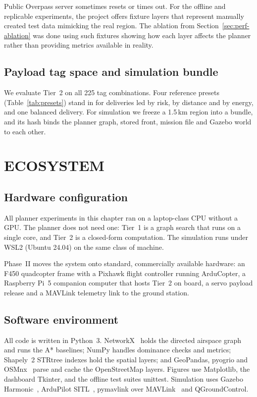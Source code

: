 Public Overpass server sometimes resets or times out. For the offline and replicable
experiments, the project offers fixture layers that represent manually created test data
mimicking the real region. The ablation from Section~\ref{sec:perf-ablation} was done
using such fixtures showing how each layer affects the planner rather than providing
metrics available in reality.

\subsection{Payload tag space and simulation bundle}

We evaluate Tier~2 on all 225 tag combinations. Four reference presets
(Table~\ref{tab:presets}) stand in for deliveries led by risk, by distance and by
energy, and one balanced delivery. For simulation we freeze a 1.5\,km region into a
bundle, and its hash binds the planner graph, stored front, mission file and Gazebo
world to each other.

\section{ECOSYSTEM}\label{sec:ecosystem}

\subsection{Hardware configuration}

All planner experiments in this chapter ran on a laptop-class CPU without a GPU. The
planner does not need one: Tier~1 is a graph search that runs on a single core, and
Tier~2 is a closed-form computation. The simulation runs under WSL2 (Ubuntu 24.04) on
the same class of machine.

Phase~II moves the system onto standard, commercially available hardware: an F450
quadcopter frame with a Pixhawk flight controller running ArduCopter, a Raspberry Pi~5
companion computer that hosts Tier~2 on board, a servo payload release and a MAVLink
telemetry link to the ground station.

\subsection{Software environment}

All code is written in Python~3. NetworkX~\cite{r5} holds the directed airspace
graph and runs the A* baselines; NumPy handles dominance checks and metrics; Shapely~2
STRtree indexes hold the spatial layers; and GeoPandas, pyogrio and OSMnx~\cite{r4}
parse and cache the OpenStreetMap layers. Figures use Matplotlib, the dashboard
Tkinter, and the offline test suites unittest. Simulation uses Gazebo
Harmonic~\cite{r24}, ArduPilot SITL~\cite{r23}, pymavlink over MAVLink~\cite{r7} and
QGroundControl.

